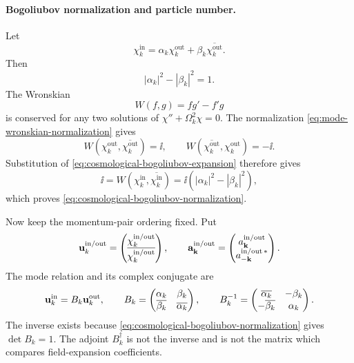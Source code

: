 \paragraph{Bogoliubov normalization and particle number.}
Let
\begin{equation}
  \chi_k^{\mathrm{in}}
  =
  \alpha_k\chi_k^{\mathrm{out}}
  +
  \beta_k\overline{\chi_k^{\mathrm{out}}}.
  \label{eq:cosmological-bogoliubov-expansion}
\end{equation}
Then
\begin{equation}
  |\alpha_k|^2-|\beta_k|^2=1.
  \label{eq:cosmological-bogoliubov-normalization}
\end{equation}
The Wronskian
\[
  W(f,g)=f g'-f'g
\]
is conserved for any two solutions of
\(\chi''+\Omega_k^2\chi=0\).  The normalization
\eqref{eq:mode-wronskian-normalization} gives
\[
  W(\chi_k^{\mathrm{out}},\overline{\chi_k^{\mathrm{out}}})=\ii,
  \qquad
  W(\overline{\chi_k^{\mathrm{out}}},\chi_k^{\mathrm{out}})=-\ii.
  \]
Substitution of \eqref{eq:cosmological-bogoliubov-expansion} therefore gives
\[
  \ii
  =
  W(\chi_k^{\mathrm{in}},\overline{\chi_k^{\mathrm{in}}})
  =
  \ii(|\alpha_k|^2-|\beta_k|^2),
  \]
which proves \eqref{eq:cosmological-bogoliubov-normalization}.

Now keep the momentum-pair ordering fixed.  Put
\[
  \mathbf u_k^{\rm in/out}
  =
  \begin{pmatrix}
    \chi_k^{\rm in/out}\\
    \overline{\chi_k^{\rm in/out}}
  \end{pmatrix},
  \qquad
  \mathbf a_{\mathbf k}^{\rm in/out}
  =
  \begin{pmatrix}
    a_{\mathbf k}^{\rm in/out}\\
    a_{-\mathbf k}^{\rm in/out\,*}
  \end{pmatrix}.
\]
The mode relation and its complex conjugate are
\begin{equation}
  \mathbf u_k^{\rm in}
  =
  B_k\mathbf u_k^{\rm out},
  \qquad
  B_k=
  \begin{pmatrix}
    \alpha_k&\beta_k\\
    \overline{\beta_k}&\overline{\alpha_k}
  \end{pmatrix},
  \qquad
  B_k^{-1}=
  \begin{pmatrix}
    \overline{\alpha_k}&-\beta_k\\
    -\overline{\beta_k}&\alpha_k
  \end{pmatrix}.
  \label{eq:cosmological-bogoliubov-mode-matrix}
\end{equation}
The inverse exists because
\eqref{eq:cosmological-bogoliubov-normalization} gives
\(\det B_k=1\).  The adjoint \(B_k^\dagger\) is not the inverse and is not the
matrix which compares field-expansion coefficients.

